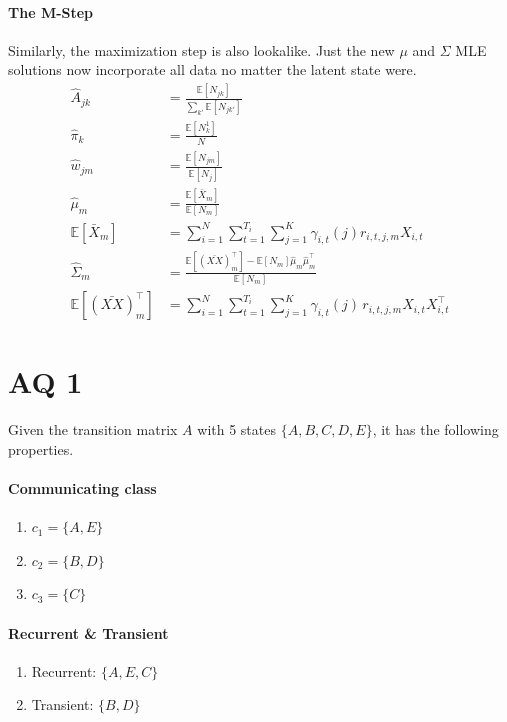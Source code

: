 \documentclass[11pt, letterpaper]{article}
\begin{document}
\paragraph{The M-Step} Similarly, the maximization step is also lookalike. Just the new $\mu$ and $\Sigma$ MLE solutions now incorporate all data no matter the latent state were.
\begin{align*}
    \hat{A}_{jk} &= \frac{\mathbb{E}[N_{jk}]}{\sum_{k'} \mathbb{E}[N_{jk'}]} \\
    \hat{\pi}_k &= \frac{\mathbb{E}[N_{k}^1]}{N} \\
    \hat{w}_{jm} &= \frac{\mathbb{E}[N_{jm}]}{\mathbb{E}[N_{j}]} \\
    \hat{\mu}_{m} &= \frac{\mathbb{E}[\bar{X}_{m}]}{\mathbb{E}[N_{m}]} \\
    \mathbb{E}[\bar{X}_{m}] &=
        \sum_{i=1}^N \sum_{t=1}^{T_i} \sum_{j=1}^{K} \gamma_{i, t}(j) r_{i,t,j,m} X_{i,t} \\
    \hat{\Sigma}_{m} &=
        \frac{
            \mathbb{E}[(\bar{XX})^{\intercal}_{m}]
            - \mathbb{E}[N_{m}] \hat{\mu}_{m} \hat{\mu}_{m}^{\intercal}
        } {\mathbb{E}[N_{m}]} \\
    \mathbb{E}[(\bar{XX})^{\intercal}_{m}] &=
        \sum_{i=1}^N \sum_{t=1}^{T_i} \sum_{j=1}^{K} \gamma_{i,t}(j) \, r_{i,t,j,m} X_{i,t} X_{i,t}^{\intercal} 
\end{align*}

\section{AQ 1}
Given the transition matrix $A$ with 5 states $\{A, B, C, D, E\}$, it has the following properties.
\paragraph{Communicating class}
\begin{enumerate}
  \item $c_1 = \{A, E\}$
  \item $c_2 = \{B, D\}$
  \item $c_3 = \{C\}$
\end{enumerate}

\paragraph{Recurrent & Transient}
\begin{enumerate}
  \item Recurrent: $\{A, E, C\}$
  \item Transient: $\{B, D\}$
\end{enumerate}
\end{document}
